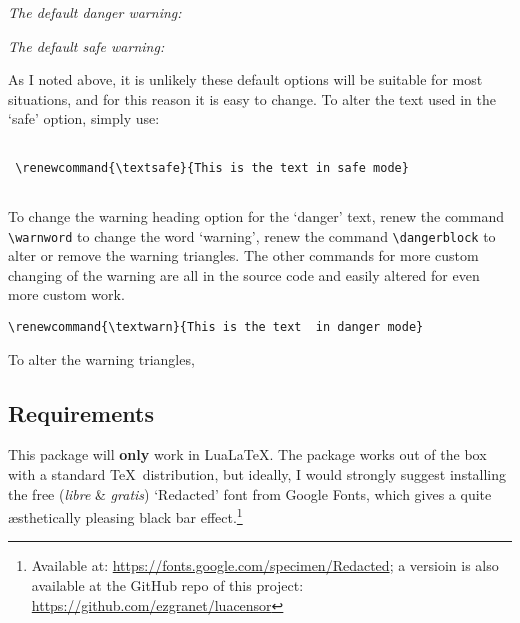 \documentclass{article}
\begin{document}
\begin{center}
\textit{The default danger warning:}\\
\color{red}\tworules\vskip 5pt\allwarning
\vskip5pt\tworules%
\end{center}%

\begin{center}
	\textit{The default safe warning:}\\
	\begin{center}
\color{forestgreen}
\tworules\vskip5pt
\normalsize\normalfont\sffamily\bfseries\textsafe
\vskip5pt\tworules
\end{center}
\end{center}

As I noted above, it is unlikely these default options will be suitable for most situations, and for this reason it is easy to change.  To alter the text used in the `safe' option, simply use:

\noindent\begin{verbatim}
 
 \renewcommand{\textsafe}{This is the text in safe mode}	
 
\end{verbatim}

To change the warning heading option for the `danger' text, renew the command \verb+\warnword+ to change the word `warning', renew the command \verb+\dangerblock+ to alter or remove the warning triangles.  The other commands for more custom changing of the warning are all in the source code and easily altered for even more custom work.

\noindent\begin{verbatim}
\renewcommand{\textwarn}{This is the text  in danger mode}	
\end{verbatim}
To alter the warning triangles, 


		
		


\subsection{Requirements}
This package will \textbf{only} work in Lua\LaTeX. The package works out of the box with a standard \TeX\ distribution, but ideally, I would strongly suggest installing the free (\textit{libre} \& \textit{gratis}) `Redacted' font from Google Fonts, which gives a quite æsthetically pleasing black bar effect.\footnote{Available at: \url{https://fonts.google.com/specimen/Redacted}; a versioin is also available at the GitHub repo of this project: \url{https://github.com/ezgranet/luacensor}}
\end{document}
